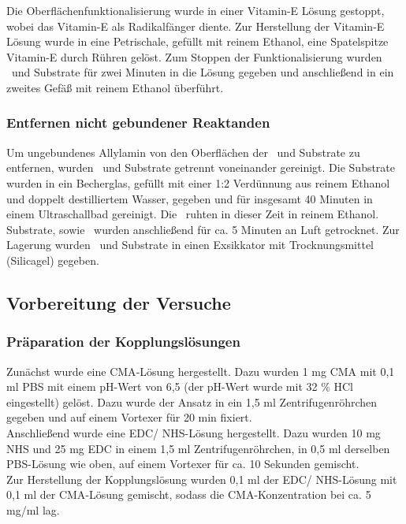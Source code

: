 Die Oberflächenfunktionalisierung wurde in einer Vitamin-E Lösung gestoppt, wobei das Vitamin-E als Radikalfänger diente. Zur Herstellung der Vitamin-E Lösung wurde in eine Petrischale, gefüllt mit reinem Ethanol, eine Spatelspitze Vitamin-E durch Rühren gelöst. Zum Stoppen der Funktionalisierung wurden \spitzen~und Substrate für zwei Minuten in die Lösung gegeben und anschließend in ein zweites Gefäß mit reinem Ethanol überführt.

\subsubsection{Entfernen nicht gebundener Reaktanden}
\label{subsubsec:entfernen_nicht_gebundener_reaktanden}

Um ungebundenes Allylamin von den Oberflächen der \spitzen~und Substrate zu entfernen, wurden \spitzen~und Substrate getrennt voneinander gereinigt. Die Substrate wurden in ein Becherglas, gefüllt mit einer 1:2 Verdünnung aus reinem Ethanol und doppelt destilliertem Wasser, gegeben und für insgesamt 40 Minuten in einem Ultraschallbad gereinigt. Die \spitzen~ruhten in dieser Zeit in reinem Ethanol. Substrate, sowie \spitzen~wurden anschließend für ca. 5 Minuten an Luft getrocknet. Zur Lagerung wurden \spitzen~und Substrate in einen Exsikkator mit Trocknungsmittel (Silicagel) gegeben.

\subsection{Vorbereitung der Versuche}
\label{subsec:vorbereitung_der_versuche}

\subsubsection{Präparation der Kopplungslösungen}
\label{subsubsec:präparation_der_kopplungslösungen}

Zunächst wurde eine \ac{CMA}-Lösung hergestellt. Dazu wurden 1 mg \ac{CMA} mit 0,1 ml \ac{PBS} mit einem pH-Wert von 6,5 (der pH-Wert wurde mit 32 \% \ac{HCl} eingestellt) gelöst. Dazu wurde der Ansatz in ein 1,5 ml Zentrifugenröhrchen gegeben und auf einem Vortexer für 20 min fixiert.\\
Anschließend wurde eine \ac{EDC}/ \ac{NHS}-Lösung hergestellt. Dazu wurden 10 mg \ac{NHS} und 25 mg \ac{EDC} in einem 1,5 ml Zentrifugenröhrchen, in 0,5 ml derselben \ac{PBS}-Lösung wie oben, auf einem Vortexer für ca. 10 Sekunden gemischt.\\
Zur Herstellung der Kopplungslösung wurden 0,1 ml der \ac{EDC}/ \ac{NHS}-Lösung mit 0,1 ml der \ac{CMA}-Lösung gemischt, sodass die \ac{CMA}-Konzentration bei ca. 5 mg/ml lag.

